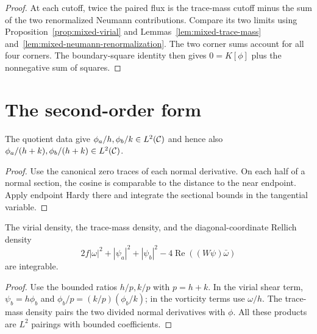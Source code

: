 \begin{proof}
\leanok
At each cutoff, twice the paired flux is the trace-mass cutoff minus
the sum of the two renormalized Neumann contributions. Compare its two
limits using Proposition~\ref{prop:mixed-virial} and
Lemmas~\ref{lem:mixed-trace-mass} and~\ref{lem:mixed-neumann-renormalization}.
The two corner sums account for all four corners. The boundary-square
identity then gives $0=K[\phi]$ plus the nonnegative sum of squares.
\end{proof}

\section{The second-order form}

\begin{lemma}
\label{lem:mixed-rellich-hardy}
\leanok
The quotient data give $\phi_a/h,\phi_b/k\in L^2(\mathcal{C})$ and hence also
$\phi_a/(h+k),\phi_b/(h+k)\in L^2(\mathcal{C})$.
\end{lemma}

\begin{proof}
\leanok
Use the canonical zero traces of each normal derivative. On each half
of a normal section, the cosine is comparable to the distance to the
near endpoint. Apply endpoint Hardy there and integrate the sectional
bounds in the tangential variable.
\end{proof}

\begin{lemma}
\label{lem:mixed-rellich-volume}
\leanok
The virial density, the trace-mass density, and the diagonal-coordinate
Rellich density
\[
  2f|\omega|^2+|\psi_a|^2+|\psi_b|^2-4\operatorname{Re}((W\psi)\bar\omega)
\]
are integrable.
\end{lemma}

\begin{proof}
\leanok
Use the bounded ratios $h/p,k/p$ with $p=h+k$. In the virial shear term,
$\psi_b=h\phi_b$ and $\phi_b/p=(k/p)(\phi_b/k)$; in the vorticity terms
use $\omega/h$. The trace-mass density pairs the two divided normal
derivatives with $\phi$. All these products are $L^2$ pairings with
bounded coefficients.
\end{proof}

